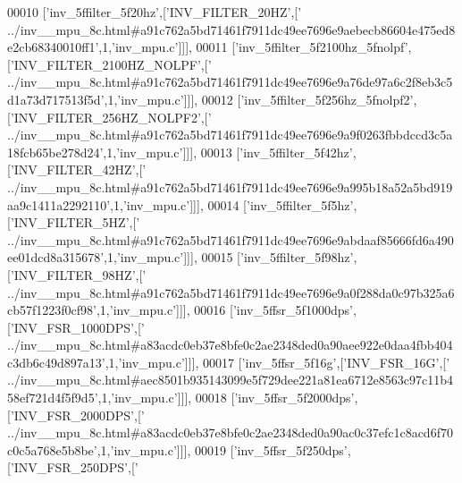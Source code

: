 \begin{DoxyCode}
00010   [\textcolor{stringliteral}{'inv\_5ffilter\_5f20hz'},[\textcolor{stringliteral}{'INV\_FILTER\_20HZ'},[\textcolor{stringliteral}{'
      ../inv\_\_mpu\_8c.html#a91c762a5bd71461f7911dc49ee7696e9aebecb86604e475ed8e2cb68340010ff1'},1,\textcolor{stringliteral}{'inv\_mpu.c'}]]],
00011   [\textcolor{stringliteral}{'inv\_5ffilter\_5f2100hz\_5fnolpf'},[\textcolor{stringliteral}{'INV\_FILTER\_2100HZ\_NOLPF'},[\textcolor{stringliteral}{'
      ../inv\_\_mpu\_8c.html#a91c762a5bd71461f7911dc49ee7696e9a76de97a6c2f8eb3c5d1a73d717513f5d'},1,\textcolor{stringliteral}{'inv\_mpu.c'}]]],
00012   [\textcolor{stringliteral}{'inv\_5ffilter\_5f256hz\_5fnolpf2'},[\textcolor{stringliteral}{'INV\_FILTER\_256HZ\_NOLPF2'},[\textcolor{stringliteral}{'
      ../inv\_\_mpu\_8c.html#a91c762a5bd71461f7911dc49ee7696e9a9f0263fbbdccd3c5a18fcb65be278d24'},1,\textcolor{stringliteral}{'inv\_mpu.c'}]]],
00013   [\textcolor{stringliteral}{'inv\_5ffilter\_5f42hz'},[\textcolor{stringliteral}{'INV\_FILTER\_42HZ'},[\textcolor{stringliteral}{'
      ../inv\_\_mpu\_8c.html#a91c762a5bd71461f7911dc49ee7696e9a995b18a52a5bd919aa9c1411a2292110'},1,\textcolor{stringliteral}{'inv\_mpu.c'}]]],
00014   [\textcolor{stringliteral}{'inv\_5ffilter\_5f5hz'},[\textcolor{stringliteral}{'INV\_FILTER\_5HZ'},[\textcolor{stringliteral}{'
      ../inv\_\_mpu\_8c.html#a91c762a5bd71461f7911dc49ee7696e9abdaaf85666fd6a490ee01dcd8a315678'},1,\textcolor{stringliteral}{'inv\_mpu.c'}]]],
00015   [\textcolor{stringliteral}{'inv\_5ffilter\_5f98hz'},[\textcolor{stringliteral}{'INV\_FILTER\_98HZ'},[\textcolor{stringliteral}{'
      ../inv\_\_mpu\_8c.html#a91c762a5bd71461f7911dc49ee7696e9a0f288da0c97b325a6cb57f1223f0cf98'},1,\textcolor{stringliteral}{'inv\_mpu.c'}]]],
00016   [\textcolor{stringliteral}{'inv\_5ffsr\_5f1000dps'},[\textcolor{stringliteral}{'INV\_FSR\_1000DPS'},[\textcolor{stringliteral}{'
      ../inv\_\_mpu\_8c.html#a83acdc0eb37e8bfe0c2ae2348ded0a90aee922e0daa4fbb404c3db6c49d897a13'},1,\textcolor{stringliteral}{'inv\_mpu.c'}]]],
00017   [\textcolor{stringliteral}{'inv\_5ffsr\_5f16g'},[\textcolor{stringliteral}{'INV\_FSR\_16G'},[\textcolor{stringliteral}{'
      ../inv\_\_mpu\_8c.html#aec8501b935143099e5f729dee221a81ea6712e8563c97c11b458ef721d4f5f9d5'},1,\textcolor{stringliteral}{'inv\_mpu.c'}]]],
00018   [\textcolor{stringliteral}{'inv\_5ffsr\_5f2000dps'},[\textcolor{stringliteral}{'INV\_FSR\_2000DPS'},[\textcolor{stringliteral}{'
      ../inv\_\_mpu\_8c.html#a83acdc0eb37e8bfe0c2ae2348ded0a90ac0c37efc1c8acd6f70c0c5a768e5b8be'},1,\textcolor{stringliteral}{'inv\_mpu.c'}]]],
00019   [\textcolor{stringliteral}{'inv\_5ffsr\_5f250dps'},[\textcolor{stringliteral}{'INV\_FSR\_250DPS'},[\textcolor{stringliteral}{'
}
\end{DoxyCode}
